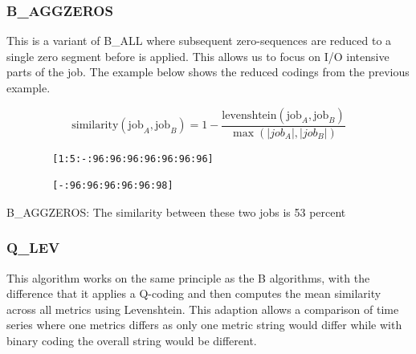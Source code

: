 \documentclass{jhps}
\begin{document}
\subsubsection{B\_AGGZEROS}
This is a variant of B\_ALL where subsequent zero-sequences are reduced to a single zero segment before  is applied.
This allows us to focus on I/O intensive parts of the job.
The example below shows the reduced codings from the previous example.

\begin{equation}
	\text{similarity} \left(\text{job}_{A},\text{job}_{B} \right) =1- \frac{\text{levenshtein} \left(\text{job}_{A},\text{job}_{B} \right) }{\max \left( |job_{A}|,|job_{B}| \right) } \label{eq:sim:bin_aggzeros}
\end{equation}


\begin{listing}
	\noindent\begin{minipage}{0.49\textwidth}
		\begin{lstlisting}
		[1:5:-:96:96:96:96:96:96:96]
		\end{lstlisting}
		\vspace{-2em}
		\label{lst:sim:bin_aggzeros:job_a}
	\end{minipage}
	\noindent\begin{minipage}{0.49\textwidth}
		\begin{lstlisting}
		[-:96:96:96:96:96:98]
		\end{lstlisting}
		\vspace{-2em}
		\label{lst:sim:bin_aggzeros:job_b}
	\end{minipage}
	\caption{B\_AGGZEROS: The similarity between these two jobs is 53 percent}
	\label{lst:sim:bin_aggzeros}
\end{listing}

  \subsubsection{Q\_LEV}
This algorithm works on the same principle as the B algorithms, with the difference that it applies a Q-coding and then computes the mean similarity across all metrics using Levenshtein.
This adaption allows a comparison of time series where one metrics differs as only one metric string would differ while with binary coding the overall string would be different.
\end{document}

